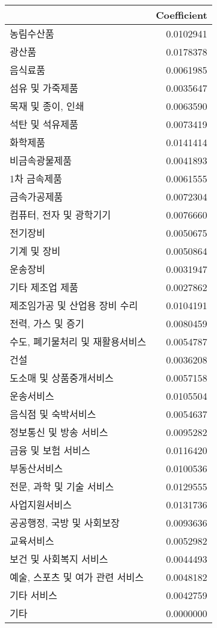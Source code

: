 \documentclass[]{article}
\newenvironment{Shaded}{\begin{snugshade}}{\end{snugshade}}
\newcommand{\DecValTok}[1]{\textcolor[rgb]{0.00,0.00,0.81}{#1}}
\newcommand{\KeywordTok}[1]{\textcolor[rgb]{0.13,0.29,0.53}{\textbf{#1}}}
\newcommand{\NormalTok}[1]{#1}
\newcommand{\OperatorTok}[1]{\textcolor[rgb]{0.81,0.36,0.00}{\textbf{#1}}}
\newcommand{\StringTok}[1]{\textcolor[rgb]{0.31,0.60,0.02}{#1}}
\begin{document}
\begin{Shaded}
\end{Shaded}

\begin{longtable}[]{@{}lr@{}}
\toprule
& Coefficient\tabularnewline
\midrule
\endhead
농림수산품 & 0.0102941\tabularnewline
광산품 & 0.0178378\tabularnewline
음식료품 & 0.0061985\tabularnewline
섬유 및 가죽제품 & 0.0035647\tabularnewline
목재 및 종이, 인쇄 & 0.0063590\tabularnewline
석탄 및 석유제품 & 0.0073419\tabularnewline
화학제품 & 0.0141414\tabularnewline
비금속광물제품 & 0.0041893\tabularnewline
1차 금속제품 & 0.0061555\tabularnewline
금속가공제품 & 0.0072304\tabularnewline
컴퓨터, 전자 및 광학기기 & 0.0076660\tabularnewline
전기장비 & 0.0050675\tabularnewline
기계 및 장비 & 0.0050864\tabularnewline
운송장비 & 0.0031947\tabularnewline
기타 제조업 제품 & 0.0027862\tabularnewline
제조임가공 및 산업용 장비 수리 & 0.0104191\tabularnewline
전력, 가스 및 증기 & 0.0080459\tabularnewline
수도, 폐기물처리 및 재활용서비스 & 0.0054787\tabularnewline
건설 & 0.0036208\tabularnewline
도소매 및 상품중개서비스 & 0.0057158\tabularnewline
운송서비스 & 0.0105504\tabularnewline
음식점 및 숙박서비스 & 0.0054637\tabularnewline
정보통신 및 방송 서비스 & 0.0095282\tabularnewline
금융 및 보험 서비스 & 0.0116420\tabularnewline
부동산서비스 & 0.0100536\tabularnewline
전문, 과학 및 기술 서비스 & 0.0129555\tabularnewline
사업지원서비스 & 0.0131736\tabularnewline
공공행정, 국방 및 사회보장 & 0.0093636\tabularnewline
교육서비스 & 0.0052982\tabularnewline
보건 및 사회복지 서비스 & 0.0044493\tabularnewline
예술, 스포츠 및 여가 관련 서비스 & 0.0048182\tabularnewline
기타 서비스 & 0.0042759\tabularnewline
기타 & 0.0000000\tabularnewline
\bottomrule
\end{longtable}
\end{document}
